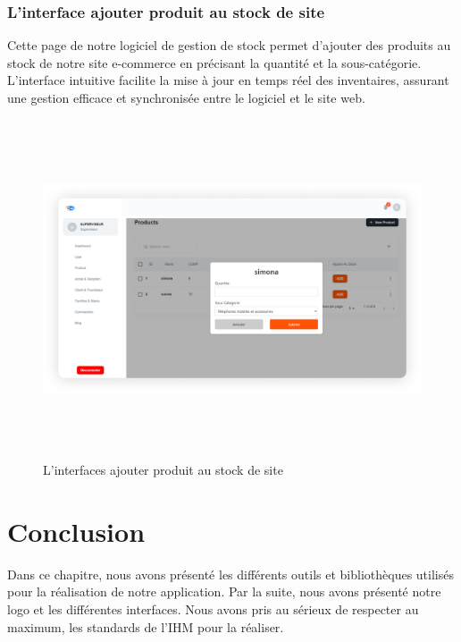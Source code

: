 \documentclass[edit,12pt,a4paper,ChapStyle,oneside,doubleinterligne]{report}
\begin{document}
\subsubsection{L'interface ajouter produit au stock de site}
Cette page de notre logiciel de gestion de stock permet d'ajouter des produits au stock de notre site e-commerce en précisant la quantité et la sous-catégorie. L'interface intuitive facilite la mise à jour en temps réel des inventaires, assurant une gestion efficace et synchronisée entre le logiciel et le site web.
  \begin{figure} [H]
    \centering
    \includegraphics[width = 15.319375cm , height = 10cm , angle=360]{images/ajouter produit au stock de site 1.png}
    \caption{L'interfaces ajouter produit au stock de site}
    \label{fig:ajouter produit au stock de site}
\end{figure}
\section{Conclusion}
Dans ce chapitre, nous avons présenté les différents outils et bibliothèques utilisés pour la réalisation de notre application.
Par la suite, nous avons présenté notre logo et les différentes interfaces. Nous avons pris au sérieux de respecter au maximum, les standards de l’IHM pour la réaliser.
\end{document}
